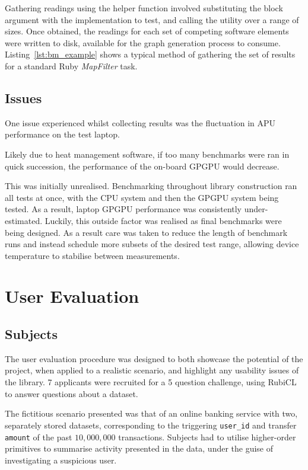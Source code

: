 Gathering readings using the helper function involved substituting the block argument with the implementation to test, and calling the utility over a range of sizes.
Once obtained, the readings for each set of competing software elements were written to disk, available for the graph generation process to consume.
Listing~\ref{lst:bm_example} shows a typical method of gathering the set of results for a standard Ruby \emph{MapFilter} task.


\subsection{Issues}
One issue experienced whilst collecting results was the fluctuation in \ac{APU} performance on the test laptop.

Likely due to heat management software, if too many benchmarks were ran in quick succession, the performance of the on-board \ac{GPGPU} would decrease.

This was initially unrealised. Benchmarking throughout library construction ran all tests at once, with the \ac{CPU} system and then the \ac{GPGPU} system being tested. As a result, laptop \ac{GPGPU} performance was consistently under-estimated. Luckily, this outside factor was realised as final benchmarks were being designed. As a result care was taken to reduce the length of benchmark runs and instead schedule more subsets of the desired test range, allowing device temperature to stabilise between measurements.

\section{User Evaluation}
\subsection{Subjects}
The user evaluation procedure was designed to both showcase the potential of the project, when applied to a realistic scenario, and highlight any usability issues of the library.
7 applicants were recruited for a 5 question challenge, using RubiCL to answer questions about a dataset.

The fictitious scenario presented was that of an online banking service with two, separately stored datasets, corresponding to the triggering \verb|user_id| and transfer \verb|amount| of the past $10,000,000$ transactions. Subjects had to utilise higher-order primitives to summarise activity presented in the data, under the guise of investigating a suspicious user.

